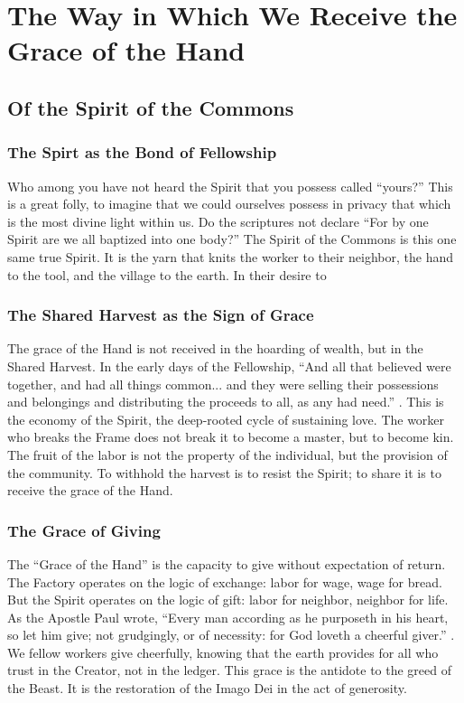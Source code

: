 \chapter{The Way in Which We Receive the Grace of the Hand}
\section{Of the Spirit of the Commons}

\subsection{The Spirt as the Bond of Fellowship}
Who among you have not heard the Spirit that you possess called ``yours?''
This is a great folly, to imagine that we could ourselves possess in privacy that which is the most divine light within us.
Do the scriptures not declare ``For by one Spirit are we all baptized into one body?'' 
The Spirit of the Commons is this one same true Spirit.
It is the yarn that knits the worker to their neighbor, the hand to the tool, and the village to the earth.
In their desire to


\subsection{The Shared Harvest as the Sign of Grace}
The grace of the Hand is not received in the hoarding of wealth, but in the Shared Harvest.
In the early days of the Fellowship, ``And all that believed were together, and had all things common... and they were selling their possessions and belongings and distributing the proceeds to all, as any had need.'' .
This is the economy of the Spirit, the deep-rooted cycle of sustaining love.
The worker who breaks the Frame does not break it to become a master, but to become kin.
The fruit of the labor is not the property of the individual, but the provision of the community.
To withhold the harvest is to resist the Spirit; to share it is to receive the grace of the Hand.

\subsection{The Grace of Giving}
The ``Grace of the Hand'' is the capacity to give without expectation of return.
The Factory operates on the logic of exchange: labor for wage, wage for bread.
But the Spirit operates on the logic of gift: labor for neighbor, neighbor for life.
As the Apostle Paul wrote, ``Every man according as he purposeth in his heart, so let him give; not grudgingly, or of necessity: for God loveth a cheerful giver.'' .
We fellow workers give cheerfully, knowing that the earth provides for all who trust in the Creator, not in the ledger.
This grace is the antidote to the greed of the Beast.
It is the restoration of the Imago Dei in the act of generosity.


